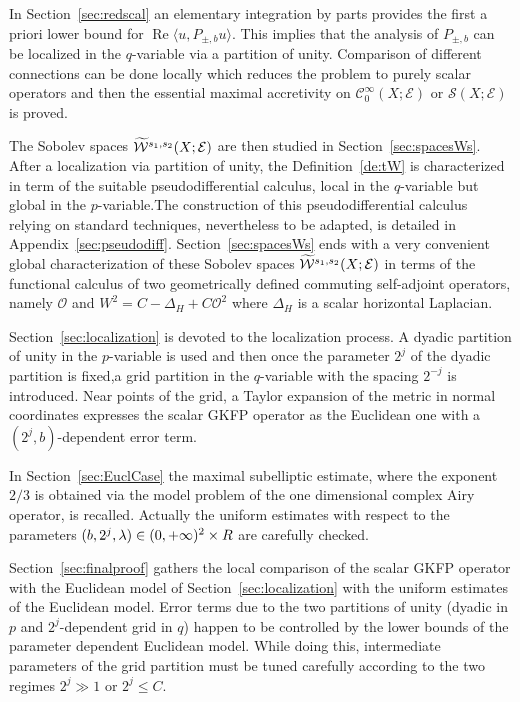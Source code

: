\documentclass[AHL,Unicode,longabstracts]{cedram}
\newcommand{\clW}{\mathcal{W}}
\newcommand{\clC}{\mathcal{C}}
\newcommand{\clO}{\mathcal{O}}
\newcommand{\clE}{\mathcal{E}}
\newcommand{\clS}{\mathcal{S}}
\DeclareMathOperator{\Ree}{Re}
\let\oldtilde\tilde
\renewcommand*{\tilde}[1]{\mathchoice{\widetilde{#1}}{\widetilde{#1}}{\oldtilde{#1}}{\oldtilde{#1}}}
\begin{document}
In Section~\ref{sec:redscal} an elementary integration by parts provides the first a priori lower bound for $\Ree\langle u, P_{\pm,b}u\rangle$. This implies that the analysis of $P_{\pm,b}$ can be localized in the $q$-variable via a partition of unity. Comparison of different connections can be done locally which reduces the problem to purely scalar operators and then the essential maximal accretivity on $\clC^{\infty}_{0}(X;\clE)$ or $\clS(X;\clE)$ is proved.

The Sobolev spaces $\tilde{\clW}^{s_1,s_2}(X;\clE)$ are then studied in Section~{\ref{sec:spacesWs}}. After a localization via partition of unity, the Definition~\ref{de:tW} is characterized in term of the suitable pseudodifferential calculus, local in the $q$-variable but global in the $p$-variable.\linebreak The construction of this pseudodifferential calculus relying on standard techniques, nevertheless to be adapted, is detailed in Appendix~\ref{sec:pseudodiff}. Section~\ref{sec:spacesWs} ends with a very convenient global characterization of these Sobolev spaces $\tilde{\clW}^{s_1,s_2}(X;\clE)$ in terms of the functional calculus of two geometrically defined commuting self-adjoint operators, namely $\clO$ and $W^2=C-\Delta_H +C\clO^2$ where $\Delta_H$ is a scalar horizontal Laplacian.

Section~\ref{sec:localization} is devoted to the localization process. A dyadic partition of unity in the $p$-variable is used and then once the parameter $2^j$ of the dyadic partition is fixed,\linebreak a grid partition in the $q$-variable with the spacing $2^{-j}$ is introduced. Near points of the grid, a Taylor expansion of the metric in normal coordinates expresses the scalar GKFP operator as the Euclidean one with a $(2^j,b)$-dependent error term.

In Section~\ref{sec:EuclCase} the maximal subelliptic estimate, where the exponent $2/3$ is obtained via the model problem of the one dimensional complex Airy operator, is recalled. Actually the uniform estimates with respect to the parameters $(b,2^j,\lambda)\in\linebreak (0,+\infty)^2\times R$ are carefully checked.

Section~\ref{sec:finalproof} gathers the local comparison of the scalar GKFP operator with the Euclidean model of Section~\ref{sec:localization} with the uniform estimates of the Euclidean model. Error terms due to the two partitions of unity (dyadic in $p$ and $2^j$-dependent grid in $q$) happen to be controlled by the lower bounds of the parameter dependent Euclidean model. While doing this, intermediate parameters of the grid partition must be tuned carefully according to the two regimes $2^j\gg 1$ or $2^j\leq C$.
\end{document}
